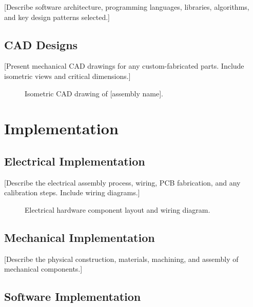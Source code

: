 \documentclass[12pt, a4paper]{report}
\begin{document}
[Describe software architecture, programming languages, libraries,
algorithms, and key design patterns selected.]

\section{CAD Designs}
\label{sec:cad}

[Present mechanical CAD drawings for any custom-fabricated parts.
Include isometric views and critical dimensions.]

\begin{figure}[H]
    \centering
    \caption{Isometric CAD drawing of [assembly name].}
    \label{fig:cad-isometric}
\end{figure}

\chapter{Implementation}
\label{ch:implementation}

\section{Electrical Implementation}
\label{sec:elec-impl}

[Describe the electrical assembly process, wiring, PCB fabrication,
and any calibration steps. Include wiring diagrams.]

\begin{figure}[H]
    \centering
    \caption{Electrical hardware component layout and wiring diagram.}
    \label{fig:wiring}
\end{figure}

\section{Mechanical Implementation}
\label{sec:mech-impl}

[Describe the physical construction, materials, machining, and
assembly of mechanical components.]

\section{Software Implementation}
\label{sec:sw-impl}
\end{document}
